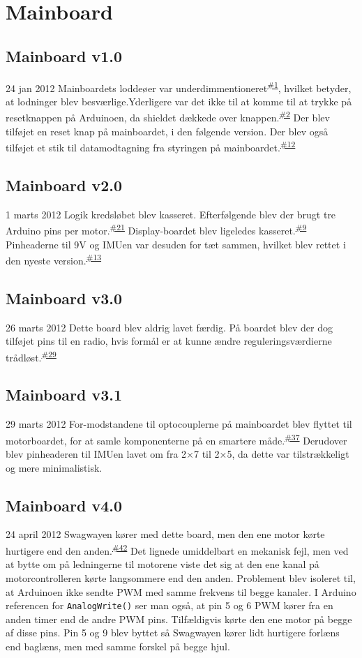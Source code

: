 \documentclass[a4paper,oneside,article,danish,table]{memoir}
\newcommand{\boarddate}[1]{\textcolor{blue!80!black}{#1}}
\newcommand{\issue}[1]{\textsuperscript{\textcolor{blue!80!black}{\href{https://github.com/neic/Swagway/issues/#1}{\##1}}}}
\begin{document}
\section{Mainboard}

\subsection{Mainboard v1.0}
\boarddate{24 jan 2012}
Mainboardets loddeøer var underdimmentioneret\issue{1}, hvilket betyder, at lodninger blev besværlige.Yderligere var det ikke til at komme til at trykke på resetknappen på Arduinoen, da shieldet dækkede over knappen.\issue{2} Der blev tilføjet en reset knap på mainboardet, i den følgende version. Der blev også tilføjet et stik til datamodtagning fra styringen på mainboardet.\issue{12}

\subsection{Mainboard v2.0}
\boarddate{1 marts 2012}
Logik kredsløbet blev kasseret. Efterfølgende blev der brugt tre Arduino pins per motor.\issue{21} Display-boardet blev ligeledes kasseret.\issue{9} Pinheaderne til 9V og IMUen var desuden for tæt sammen, hvilket blev rettet i den nyeste version.\issue{13}

\subsection{Mainboard v3.0}
\boarddate{26 marts 2012} Dette board blev aldrig lavet færdig.
På boardet blev der dog tilføjet pins til en radio, hvis formål er at kunne ændre reguleringsværdierne trådløst.\issue{29}

\subsection{Mainboard v3.1}
\boarddate{29 marts 2012}
For-modstandene til optocouplerne på mainboardet blev flyttet til motorboardet, for at samle komponenterne på en smartere måde.\issue{37}
Derudover blev pinheaderen til IMUen lavet om fra 2×7 til 2×5, da dette var tilstrækkeligt og mere minimalistisk.

\subsection{Mainboard v4.0}\label{sec:main40}
\boarddate{24 april 2012}
Swagwayen kører med dette board, men den ene motor kørte hurtigere end den anden.\issue{42} Det lignede umiddelbart en mekanisk fejl, men ved at bytte om på ledningerne til motorene viste det sig at den ene kanal på motorcontrolleren kørte langsommere end den anden. 
Problement blev isoleret til, at Arduinoen ikke sendte PWM med samme frekvens til begge kanaler. I Arduino referencen for \texttt{AnalogWrite()} ser man også, at pin 5 og 6 PWM kører fra en anden timer end de andre PWM pins. Tilfældigvis kørte den ene motor på begge af disse pins. Pin 5 og 9 blev byttet så Swagwayen kører lidt hurtigere forlæns end baglæns, men med samme forskel på begge hjul.
\end{document}
